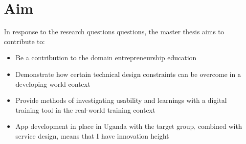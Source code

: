 \section{Aim}

In response to the research questions questions, the master thesis aims to contribute to: %

\begin{itemize}
    \item Be a contribution to the domain entrepreneurship education
    \item Demonstrate how certain technical \/ design constraints can be overcome in a developing world context %
    \item Provide methods of investigating usability and learnings with a digital training tool in the real-world training context %
\item App development in place in Uganda with the target group, combined with service design, means that I have innovation height
\end{itemize}
